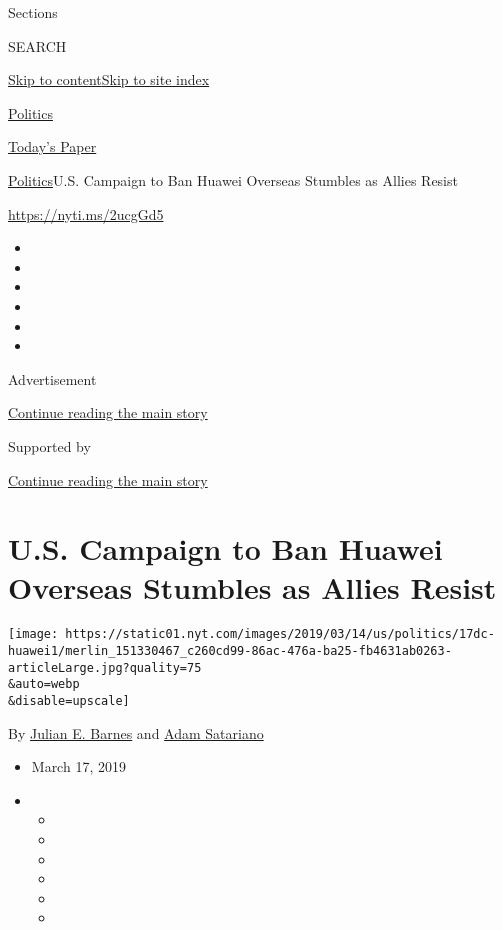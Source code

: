 Sections

SEARCH

\protect\hyperlink{site-content}{Skip to
content}\protect\hyperlink{site-index}{Skip to site index}

\href{https://www.nytimes.com/section/politics}{Politics}

\href{https://myaccount.nytimes.com/auth/login?response_type=cookie\&client_id=vi}{}

\href{https://www.nytimes.com/section/todayspaper}{Today's Paper}

\href{/section/politics}{Politics}\textbar{}U.S. Campaign to Ban Huawei
Overseas Stumbles as Allies Resist

\url{https://nyti.ms/2ucgGd5}

\begin{itemize}
\item
\item
\item
\item
\item
\item
\end{itemize}

Advertisement

\protect\hyperlink{after-top}{Continue reading the main story}

Supported by

\protect\hyperlink{after-sponsor}{Continue reading the main story}

\hypertarget{us-campaign-to-ban-huawei-overseas-stumbles-as-allies-resist}{%
\section{U.S. Campaign to Ban Huawei Overseas Stumbles as Allies
Resist}\label{us-campaign-to-ban-huawei-overseas-stumbles-as-allies-resist}}

\texttt{[image: https://static01.nyt.com/images/2019/03/14/us/politics/17dc-huawei1/merlin\_151330467\_c260cd99-86ac-476a-ba25-fb4631ab0263-articleLarge.jpg?quality=75\\\&auto=webp\\\&disable=upscale]}

By \href{https://www.nytimes.com/by/julian-e-barnes}{Julian E. Barnes}
and \href{https://www.nytimes.com/by/adam-satariano}{Adam Satariano}

\begin{itemize}
\item
  March 17, 2019
\item
  \begin{itemize}
  \item
  \item
  \item
  \item
  \item
  \item
  \end{itemize}
\end{itemize}

